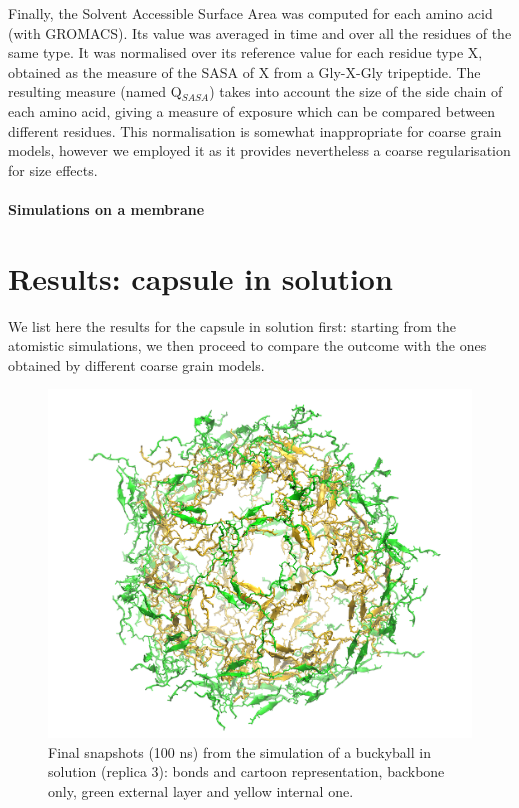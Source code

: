 Finally, the Solvent Accessible Surface Area was computed for each amino acid (with GROMACS). Its value was averaged in time and over all the residues of the same type. It was normalised over its reference value for each residue type X, obtained as the measure of the SASA of X from a Gly-X-Gly tripeptide. The resulting measure (named Q$_{SASA}$) takes into account the size of the side chain of each amino acid, giving a measure of exposure which can be compared between different residues. 
%
This normalisation is somewhat inappropriate for coarse grain models, however we employed it as it provides nevertheless a coarse regularisation for size effects.

\paragraph{Simulations on a membrane}


\section{Results: capsule in solution} \label{sec:results_cap}
We list here the results for the capsule in solution first: starting from the atomistic simulations, we then proceed to compare the outcome with the ones obtained by different coarse grain models.

\begin{figure}[t]
\centering
\includegraphics[width=0.5\linewidth]{3results_capsule/pics/staR3_render}
\caption[Atomistic run of buckyball in solution: final configuration]{Final snapshots (100 ns) from the simulation of a buckyball in solution (replica 3): bonds and cartoon representation, backbone only, green external layer and yellow internal one.}
\label{fig:BTI_snap}
\end{figure}

